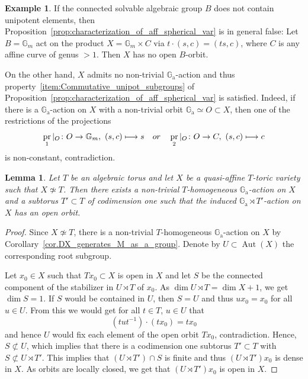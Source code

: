 \documentclass[11pt]{article}
\numberwithin{equation}{section}
\def\mto{\mathchoice{\longmapsto}{\mapsto}{\mapsto}{\mapsto}}
\newcommand{\ra}{\mathrm{a}}
\theoremstyle{plain}
\newtheorem{lemma}[theorem]{Lemma}
\theoremstyle{definition}
\newtheorem{example}[theorem]{Example}
\DeclareMathOperator{\pr}{pr}
\DeclareMathOperator{\Aut}{Aut}
\newcommand{\GG}{\mathbb{G}}
\begin{document}
\begin{example}
If the connected solvable algebraic group $B$ does not contain unipotent elements, then
Proposition~\ref{prop:characterization_of_aff_spherical_var} is in general false: Let
$B = \GG_m$ act on the product $X = \GG_m \times C$ via $t \cdot (s, c) = (ts, c)$, where $C$
is any affine curve of genus $> 1$. Then $X$ has no open $B$-orbit.

On the other hand,
$X$ admits no non-trivial $\GG_\ra$-action and thus
property~\eqref{item:Commutative_unipot_subgroups} of
Proposition~\ref{prop:characterization_of_aff_spherical_var} is satisfied.
Indeed, if there is a $\GG_\ra$-action on $X$ with a non-trivial orbit $\GG_\ra \simeq O \subset X$, then one of the restrictions
of the projections
\[
\pr_1 |_O \colon O \to \GG_m, \ (s, c) \mto s \quad \textrm{or} \quad
\pr_2 |_O \colon O \to C, \ (s, c) \mto c
\]
is non-constant, contradiction.
\end{example}

\begin{lemma}
\label{lem.open_orbit_of_solvable_group}
Let $T$ be an algebraic torus and let $X$ be a quasi-affine
$T$-toric variety such that $X \not\simeq T$.
Then there exists a non-trivial $T$-homogeneous $\GG_\ra$-action on $X$ and a
subtorus $T' \subset T$ of codimension one such that the induced
$\GG_\ra \rtimes T'$-action on $X$ has an open orbit.
\end{lemma}

\begin{proof}
Since $X \not\simeq T$,
there is a non-trivial $T$-homogeneous $\GG_\ra$-action on $X$
by Corollary~\ref{cor.DX_generates_M_as_a_group}. Denote by
$U \subset \Aut(X)$ the corresponding
root subgroup.

Let $x_0 \in X$ such that $T x_0 \subset X$ is open in $X$ and let
$S$ be the connected component of the stabilizer in $U \rtimes T$ of $x_0$.
As $\dim U \rtimes T = \dim X + 1$, we get $\dim S = 1$.
If $S$ would be contained in $U$,
then $S = U$ and thus
$u x_0 = x_0$ for all $u \in U$. From this we would get for all $t \in T$, $u \in U$ that
\[
(t u t^{-1}) \cdot (t x_0) = t x_0
\]
and hence $U$ would fix each element of the open orbit $T x_0$, contradiction.
Hence, \hbox{$S \!\not\subset\!U$}, which implies that there is a codimension one
subtorus $T' \subset T$ with $S \not\subset U \rtimes T'$. This implies that
$(U \rtimes T') \cap S$ is finite
and thus $(U \rtimes T') x_0$ is dense in $X$. As orbits are locally closed, we get that
$(U \rtimes T') x_0$ is open in $X$.
\end{proof}
\end{document}
